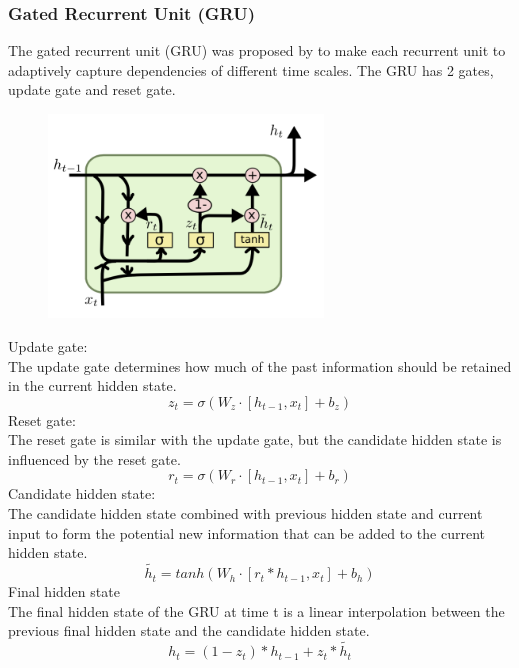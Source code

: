 \documentclass[12pt,a4paper]{article}
\begin{document}
\subsubsection{Gated Recurrent Unit (GRU)}
The gated recurrent unit (GRU) was proposed by \parencite{cho2014properties} to make each recurrent unit to adaptively capture dependencies of different time scales. The GRU has 2 gates, update gate and reset gate. 
\begin{figure}[!htb]
    \centering
    \includegraphics[width=0.65\textwidth]{../Pic/gru.png} %
\end{figure}
Update gate:
\\[1ex]
The update gate determines how much of the past information should be retained in the current hidden state. 
\begin{equation}
    z_t = \sigma(W_z \cdot [ h_{t-1} , x_t ] + b_z )
\end{equation}
Reset gate:
\\[1ex]
The reset gate is similar with the update gate, but the candidate hidden state is influenced by the reset gate. 
\begin{equation}
    r_t = \sigma( W_r \cdot [ h_{t-1} , x_t ] + b_r )
\end{equation}
Candidate hidden state:
\\[1ex]
The candidate hidden state combined with previous hidden state and current input to form the potential new information that can be added to the current hidden state.
\begin{equation}
    \widetilde{h_t} = tanh ( W_h \cdot [ r_t * h_{t-1} , x_t ] + b_h )
\end{equation}
Final hidden state
\\[1ex]
The final hidden state of the GRU at time t is a linear interpolation between the previous final hidden state and the candidate hidden state. 
\begin{equation}
    h_t = ( 1 - z_t ) * h_{t-1} + z_t * \widetilde{ h_t }
\end{equation}
\end{document}
